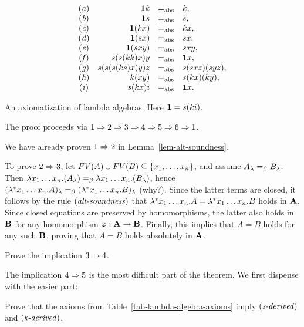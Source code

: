 \documentclass{article}
\begin{document}
\begin{table}
\[
\begin{array}{crcl}     
  ({\it a}\/) &    {\bf 1} k &=_{\rm abs}& k,
  \\      ({\it b}\/) &    {\bf 1} s &=_{\rm abs}& s,
  \\      ({\it c}\/) &    {\bf 1}(kx) &=_{\rm abs}& kx,
  \\      ({\it d}\/) &    {\bf 1}(sx) &=_{\rm abs}& sx,
  \\      ({\it e}\/) &    {\bf 1}(sxy) &=_{\rm abs}& sxy,
  \\      ({\it f}\/) &    s(s(kk)x)y  &=_{\rm abs}&{\bf 1} x,
  \\      ({\it g}\/) &    s(s(s(ks)x)y)z  &=_{\rm abs}&  s(sxz)(syz),
  \\      ({\it h}\/) &    k(xy)  &=_{\rm abs}&  s(kx)(ky),
  \\      ({\it i}\/) &    s(kx)i  &=_{\rm abs}&{\bf 1} x.
\end{array}
\]
  \caption{An axiomatization of lambda algebras. Here ${\bf 1}=s(ki)$.}\label{tab-lambda-algebra-axioms}
\end{table}

The proof proceeds via $1\Rightarrow 2\Rightarrow 3\Rightarrow 4\Rightarrow 5\Rightarrow 6\Rightarrow 1$. 

We have already proven $1\Rightarrow 2$ in Lemma~\ref{lem-alt-soundness}.

To prove $2\Rightarrow 3$, let $FV(A)\cup FV(B)\subseteq\{x_1,\ldots,x_n\}$, and
assume $A_\lambda =_{\beta} B_\lambda$. Then $\lambda x_1\ldots x_n.(A_\lambda)=_{\beta}
\lambda x_1\ldots x_n.(B_\lambda)$, hence $(\lambda^* x_1\ldots x_n.A)_\lambda
=_{\beta} (\lambda^* x_1\ldots x_n.B)_\lambda$ (why?). Since the latter terms are
closed, it follows by the rule $\textrm{(\textit{alt-soundness\/})}$ that $\lambda^* x_1\ldots
x_n.A=\lambda^* x_1\ldots x_n.B$ holds in ${\bf A}$. Since closed equations
are preserved by homomorphisms, the latter also holds in ${\bf B}$ for any
homomorphism $\varphi:{\bf A}\to{\bf B}$. Finally, this implies that $A=B$ holds
for any such ${\bf B}$, proving that $A=B$ holds absolutely in ${\bf A}$.

\begin{exercise}
  Prove the implication $3\Rightarrow 4$.
\end{exercise}

The implication $4\Rightarrow 5$ is the most difficult part of the theorem.
We first dispense with the easier part:

\begin{exercise}
  Prove that the axioms from Table~\ref{tab-lambda-algebra-axioms}
  imply $\textrm{(\textit{s-derived\/})}$ and $\textrm{(\textit{k-derived\/})}$.
\end{exercise}
\end{document}
